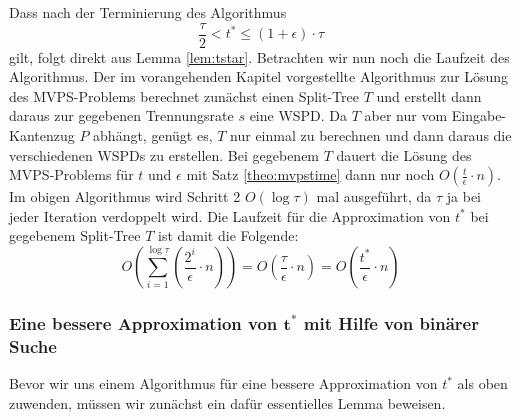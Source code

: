 Dass nach der Terminierung des Algorithmus 
\[
	\label{eq:tau}
	\frac{\tau}{2} < t^* \leq (1 + \epsilon) \cdot \tau \tag{$\ast$}
\]
gilt, folgt direkt aus Lemma \ref{lem:tstar}. 
Betrachten wir nun noch die Laufzeit des Algorithmus. 
Der im vorangehenden Kapitel vorgestellte Algorithmus zur Lösung des MVPS-Problems berechnet zunächst einen Split-Tree $T$ und erstellt dann daraus zur gegebenen Trennungsrate $s$ eine WSPD. 
Da $T$ aber nur vom Eingabe-Kantenzug $P$ abhängt, genügt es, $T$ nur einmal zu berechnen und dann daraus die verschiedenen WSPDs zu erstellen.
Bei gegebenem $T$ dauert die Lösung des MVPS-Problems für $t$ und $\epsilon$ mit Satz \ref{theo:mvpstime} dann nur noch $O(\frac{t}{\epsilon}\cdot n)$.
Im obigen Algorithmus wird Schritt 2 $O(\log \tau)$ mal ausgeführt, da $\tau$ ja bei jeder Iteration verdoppelt wird.
Die Laufzeit für die Approximation von $t^*$ bei gegebenem Split-Tree $T$ ist damit die Folgende:
\[
O(\sum_{i=1}^{\log \tau} (\frac{2^i}{\epsilon}\cdot n))
= O(\frac{\tau}{\epsilon}\cdot n)
= O(\frac{t^*}{\epsilon}\cdot n)
\]

\subsubsection*{Eine bessere Approximation von $\mathbf{t^*}$ mit Hilfe von binärer Suche}
Bevor wir uns einem Algorithmus für eine bessere Approximation von $t^*$ als oben zuwenden, müssen wir zunächst ein dafür essentielles Lemma beweisen.

